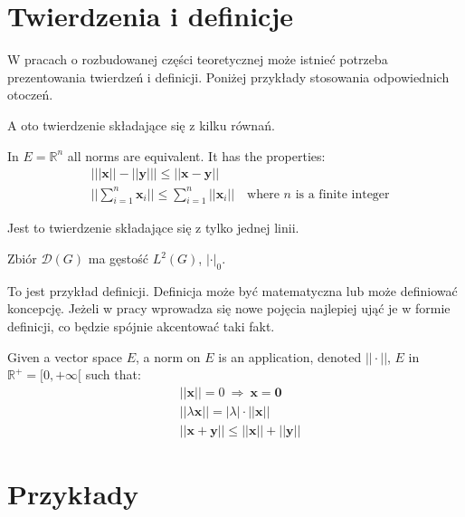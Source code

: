 \section{Twierdzenia i definicje}

W pracach o rozbudowanej części teoretycznej może istnieć potrzeba prezentowania twierdzeń i definicji. Poniżej przykłady stosowania odpowiednich otoczeń. 

A oto twierdzenie składające się z kilku równań.

\begin{theorem}
In $E=\mathbb{R}^n$ all norms are equivalent. It has the properties:
\begin{align}
& \big| ||\mathbf{x}|| - ||\mathbf{y}|| \big|\leq || \mathbf{x}- \mathbf{y}||\\
&  ||\sum_{i=1}^n\mathbf{x}_i||\leq \sum_{i=1}^n||\mathbf{x}_i||\quad\text{where $n$ is a finite integer}
\end{align}
\end{theorem}

Jest to twierdzenie składające się z tylko jednej linii.

\begin{theorem}
Zbiór $\mathcal{D}(G)$ ma gęstość $L^2(G)$, $|\cdot|_0$. 
\end{theorem}


To jest przykład definicji. Definicja może być matematyczna lub może definiować koncepcję. Jeżeli w pracy wprowadza się nowe pojęcia najlepiej ująć je w formie definicji, co będzie spójnie akcentować taki fakt.

\begin{definition}
Given a vector space $E$, a norm on $E$ is an application, denoted $||\cdot||$, $E$ in $\mathbb{R}^+=[0,+\infty[$ such that:
\begin{align}
& ||\mathbf{x}||=0\ \Rightarrow\ \mathbf{x}=\mathbf{0}\\
& ||\lambda \mathbf{x}||=|\lambda|\cdot ||\mathbf{x}||\\
& ||\mathbf{x}+\mathbf{y}||\leq ||\mathbf{x}||+||\mathbf{y}||
\end{align}
\end{definition}



\section{Przykłady}

